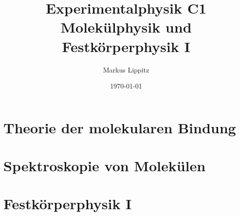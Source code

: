 \documentclass[notoc,nofonts,a4paper,twoside,nobib]{tufte-book}
\newcommand{\kapitelname}{Kapitel\ }
\begin{document}
  \tikzexternaldisable


\title{Experimentalphysik C1 \\ Molekülphysik und Festkörperphysik I}

\author{Markus Lippitz}
\date{\today}


\maketitle


%
\tableofcontents




\part{Theorie der molekularen Bindung}






\part{Spektroskopie von Molekülen}







\part{Festkörperphysik I}





%


%
%
%
%
%
%


\renewcommand{\kapitelname}{Anhang\ }


\appendix
\appendixpage





%

\printbibliography
\end{document}
